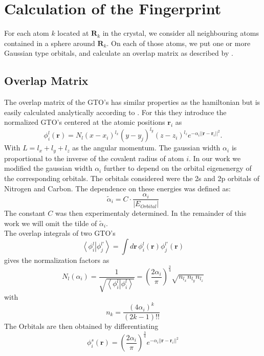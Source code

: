 \section{Calculation of the Fingerprint}
For each atom $k$ located at $\mathbf{R}_k$ in the crystal, we consider all neighbouring atoms contained in a sphere around $\mathbf{R}_k$. On each of those atoms, we put one or more Gaussian type orbitals, and calculate an overlap matrix as described by \cite{Sadeghi2013}.
\subsection{Overlap Matrix}
The overlap matrix of the GTO's has similar properties as the hamiltonian but is easily calculated analytically according to \cite{Sadeghi2013}. For this they introduce the normalized GTO's centered at the atomic positions $\mathbf{r}_i$ as
\begin{equation}\phi_i^l(\mathbf{r})=N_l(x-x_i)^{l_x}(y-y_j)^{l_y}(z-z_i)^{l_z}e^{-\alpha_i||\mathbf{r}-\mathbf{r}_i||^2}.\end{equation}
With $L=l_x+l_y+l_z$ as the angular momentum. The gaussian width $\alpha_i$ is proportional to the inverse of the covalent radius of atom $i$. In our work we modified the gaussian width $\alpha_i$ further to depend on the orbital eigenenergy of the corresponding orbitals. The orbitals considered were the 2s and 2p orbitals of Nitrogen and Carbon. The dependence on these energies was defined as:
\begin{equation}\tilde{\alpha}_i=C\cdot\frac{\alpha_i}{\left|E_{Orbital}\right|}\end{equation} 
The constant $C$ was then experimentaly determined. In the remainder of this work we will omit the tilde of $\tilde{\alpha}_i$.\\
The overlap integrals of two GTO's 
\begin{equation}\left<\phi_i^l\right|\left.\phi_j^{l'}\right>=\int d\mathbf{r}\,\phi_i^l(\mathbf{r})\phi^{l'}_j(\mathbf{r})\end{equation}
gives the normalization factors as
\begin{equation}N_l(\alpha_i)=\frac{1}{\sqrt{\left<\phi_i^l\right|\left.\phi_i^l\right>}}=\left(\frac{2\alpha_i}{\pi}\right)^{\frac{3}{4}}\sqrt{n_{l_x}n_{l_y}n_{l_z}}\end{equation}
with
$$n_k=\frac{(4\alpha_i)^k}{(2k-1)!!}$$
The Orbitals are then obtained by differentiating
$$\phi_i^s(\mathbf{r})=\left(\frac{2\alpha_i}{\pi}\right)^{\frac{3}{4}}e^{-\alpha_i||\mathbf{r}-\mathbf{r}_i||^2}$$
